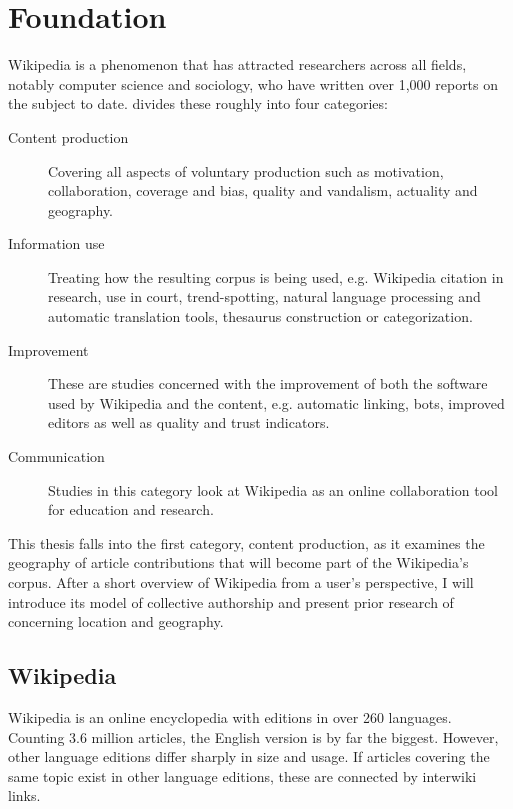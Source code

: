 \chapter{Foundation}\label{ch:foundation}

Wikipedia is a phenomenon that has attracted researchers across all fields, notably computer science and sociology, who have written over 1,000 reports on the subject to date.
\textcite{nielsen2011wikipedia} divides these roughly into four categories: 
\begin{description}
\item[Content production] Covering all aspects of voluntary production such as motivation, collaboration, coverage and bias, quality and vandalism, actuality and geography.
\item[Information use] Treating how the resulting corpus is being used, e.g. Wikipedia citation in research, use in court, trend-spotting, natural language processing and automatic translation tools, thesaurus construction or categorization.
\item[Improvement] These are studies concerned with the improvement of both the software used by Wikipedia and the content, e.g. automatic linking, bots, improved editors as well as quality and trust indicators. 
\item[Communication] Studies in this category look at Wikipedia as an online collaboration tool for education and research. 
\end{description}

This thesis falls into the first category, content production, as it examines the geography of article contributions that will become part of the Wikipedia's corpus.
After a short overview of Wikipedia from a user's perspective, I will introduce its model of collective authorship and present prior research of concerning location and geography. 

\section{Wikipedia}\label{sec:wikipedia}

Wikipedia is an online encyclopedia with editions in over 260 languages.
Counting 3.6 million articles, the English version is by far the biggest.
However, other language editions differ sharply in size and usage.\cite{wikistats}
If articles covering the same topic exist in other language editions, these are connected by interwiki links.

